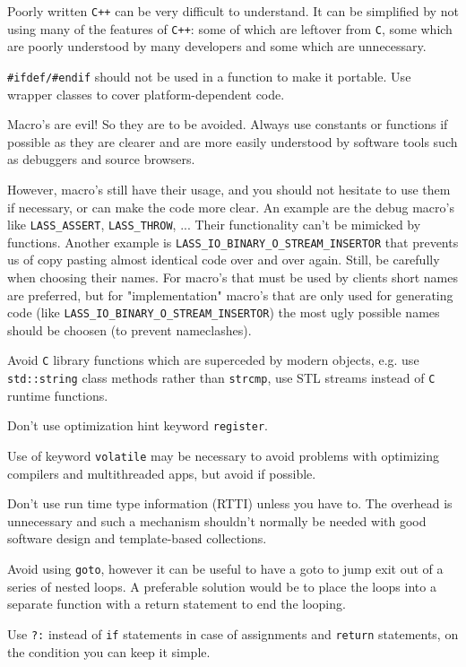 \documentclass[10pt,a4paper,titlepage,dutch]{report}
\begin{document}
Poorly written \verb|C++| can be very difficult to understand. It
can be simplified by not using many of the features of \verb|C++|:
some of which are leftover from \verb|C|, some which are poorly
understood by many developers and some which are unnecessary.

\verb|#ifdef/#endif| should not be used in a function to make it
portable. Use wrapper classes to cover platform-dependent code.

Macro's are evil!  So they are to be avoided. Always use constants
or functions if possible as they are clearer and are more easily
understood by software tools such as debuggers and source
browsers.

However, macro's still have their usage, and you should not
hesitate to use them if necessary, or can make the code more
clear.  An example are the debug macro's like \verb|LASS_ASSERT|,
\verb|LASS_THROW|, ...  Their functionality can't be mimicked by
functions.  Another example is
\verb|LASS_IO_BINARY_O_STREAM_INSERTOR| that prevents us of copy
pasting almost identical code over and over again.  Still, be
carefully when choosing their names.  For macro's that must be
used by clients short names are preferred, but for
"implementation" macro's that are only used for generating code
(like \verb|LASS_IO_BINARY_O_STREAM_INSERTOR|) the most ugly
possible names should be choosen (to prevent nameclashes).

Avoid \verb|C| library functions which are superceded by modern
objects, e.g. use \verb|std::string| class methods rather than
\verb|strcmp|, use STL streams instead of \verb|C| runtime
functions.

Don't use optimization hint keyword \verb|register|.

Use of keyword \verb|volatile| may be necessary to avoid problems
with optimizing compilers and multithreaded apps, but avoid if
possible.

Don't use run time type information (RTTI) unless you have to. The
overhead is unnecessary and such a mechanism shouldn't normally be
needed with good software design and template-based collections.

Avoid using \verb|goto|, however it can be useful to have a goto
to jump exit out of a series of nested loops. A preferable
solution would be to place the loops into a separate function with
a return statement to end the looping.

Use \verb|?:| instead of \verb|if| statements in case of
assignments and \verb|return| statements, on the condition you can
keep it simple.
\end{document}
